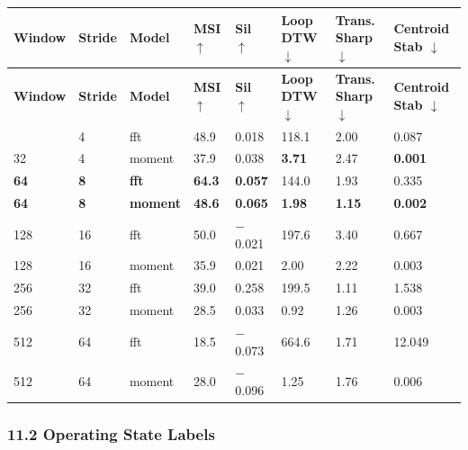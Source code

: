 \documentclass[11pt,a4paper]{article}
\begin{document}
\begin{longtable}{|l|l|l|l|l|l|l|l|}
\hline
\textbf{Window} & \textbf{Stride} & \textbf{Model} & \textbf{MSI $\uparrow$} & \textbf{Sil $\uparrow$} & \textbf{Loop DTW $\downarrow$} & \textbf{Trans. Sharp $\downarrow$} & \textbf{Centroid Stab $\downarrow$} \\
\hline
\endfirsthead
\hline
\textbf{Window} & \textbf{Stride} & \textbf{Model} & \textbf{MSI $\uparrow$} & \textbf{Sil $\uparrow$} & \textbf{Loop DTW $\downarrow$} & \textbf{Trans. Sharp $\downarrow$} & \textbf{Centroid Stab $\downarrow$} \\
\hline
\endhead
\hline
\endfoot
32 & 4 & fft & 48.9 & 0.018 & 118.1 & 2.00 & 0.087 \\
\hline
32 & 4 & moment & 37.9 & 0.038 & \textbf{3.71} & 2.47 & \textbf{0.001} \\
\hline
\textbf{64} & \textbf{8} & \textbf{fft} & \textbf{64.3} & \textbf{0.057} & 144.0 & 1.93 & 0.335 \\
\hline
\textbf{64} & \textbf{8} & \textbf{moment} & \textbf{48.6} & \textbf{0.065} & \textbf{1.98} & \textbf{1.15} & \textbf{0.002} \\
\hline
128 & 16 & fft & 50.0 & $-$0.021 & 197.6 & 3.40 & 0.667 \\
\hline
128 & 16 & moment & 35.9 & 0.021 & 2.00 & 2.22 & 0.003 \\
\hline
256 & 32 & fft & 39.0 & 0.258 & 199.5 & 1.11 & 1.538 \\
\hline
256 & 32 & moment & 28.5 & 0.033 & 0.92 & 1.26 & 0.003 \\
\hline
512 & 64 & fft & 18.5 & $-$0.073 & 664.6 & 1.71 & 12.049 \\
\hline
512 & 64 & moment & 28.0 & $-$0.096 & 1.25 & 1.76 & 0.006 \\
\hline
\end{longtable}

\subsubsection{11.2 Operating State Labels}
\end{document}

